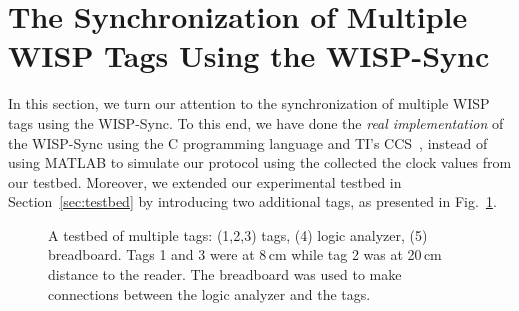 \documentclass[10pt,journal,compsoc]{IEEEtran}
\begin{document}
\section{The Synchronization of Multiple WISP Tags Using the WISP-Sync}
\label{sec:multi-wisp}

In this section, we turn our attention to the synchronization of  multiple WISP tags using the WISP-Sync. To this end, we have done the \emph{real implementation} of the WISP-Sync using the C programming language and TI's CCS~\cite{ti_css}, instead of using MATLAB to simulate our protocol using the collected the clock values from our testbed. Moreover, we extended our experimental testbed in Section~\ref{sec:testbed} by introducing two additional tags, as presented in Fig.~\ref{fig:testbed-new}. 


\begin{figure}
	\centering
	\caption{\label{fig:testbed-new} A testbed of multiple tags: (1,2,3) tags, (4) logic analyzer, (5) breadboard. Tags 1 and 3 were at 8\,cm while tag 2 was at 20\,cm distance to the reader. The breadboard was used to make connections between the logic analyzer and the tags.} 
\end{figure}
\end{document}
